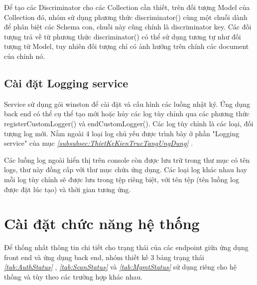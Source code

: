 Để tạo các Discriminator cho các Collection cần thiết, trên đối tượng Model của Collection đó, nhóm sử dụng phương thức discriminator() cùng một chuỗi dành để phân biệt các Schema con, chuỗi này cũng chính là discriminator key. Các đối tượng trả về từ phương thức discriminator() có thể sử dụng tương tự như đối tượng từ Model, tuy nhiên đối tượng chỉ có ảnh hưởng trên chính các document của chính nó.

\subsection{Cài đặt Logging service}

\tab Service sử dụng gói winston để cài đặt và cấu hình các luồng nhật ký.
Ứng dụng back end có thể cụ thể tạo mới hoặc hủy các log tùy chỉnh qua các phương thức registerCustomLogger() và endCustomLogger().
Các log tùy chỉnh là các loại, đối tượng log mới.
Nằm ngoài 4 loại log chủ yếu được trình bày ở phần "Logging service" của mục \textit{\ref{subsubsec:ThietKeKienTrucTangUngDung} }.

Các luồng log ngoài hiển thị trên console còn được lưu trữ trong thư mục có tên logs, thư này đồng cấp với thư mục chứa ứng dụng.
Các loại log khác nhau hay mỗi log tùy chỉnh sẽ được lưu trong tệp riêng biệt, với tên tệp (tên luồng log được đặt lúc tạo) và thời gian tương ứng.

\section{Cài đặt chức năng hệ thống} \label{sec:CaiDatChucNangHeThong}

\tab Để thống nhất thông tin chi tiết cho trạng thái của các endpoint giữa ứng dụng front end và ứng dụng back end, nhóm thiết kế 3 bảng trạng thái
\textit{\ref{tab:AuthStatus} }
, \textit{\ref{tab:ScanStatus} }
và \textit{\ref{tab:MgmtStatus} }
sử dụng riêng cho hệ thống và tùy theo các trường hợp khác nhau.

